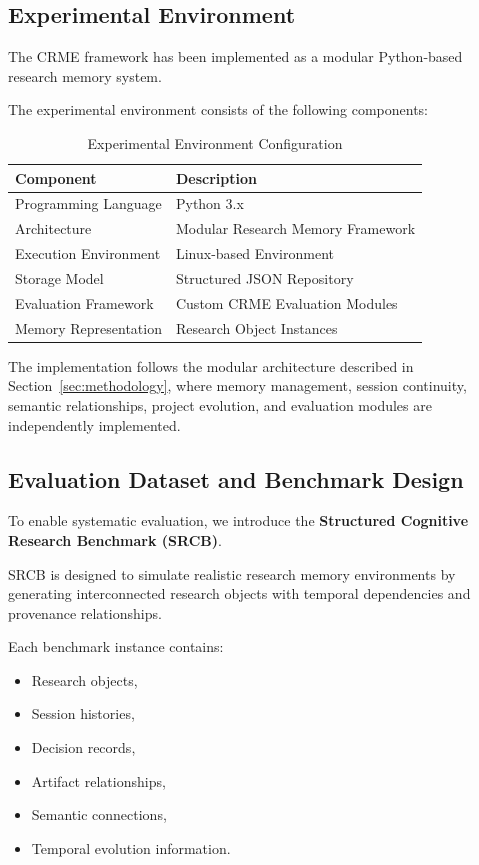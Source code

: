 \subsection{Experimental Environment}

The CRME framework has been implemented as a modular Python-based research memory system.

The experimental environment consists of the following components:

\begin{table}[h]
\centering
\caption{Experimental Environment Configuration}
\label{tab:experimental_environment}

\begin{tabular}{ll}
\hline
Component & Description\\
\hline
Programming Language & Python 3.x\\
Architecture & Modular Research Memory Framework\\
Execution Environment & Linux-based Environment\\
Storage Model & Structured JSON Repository\\
Evaluation Framework & Custom CRME Evaluation Modules\\
Memory Representation & Research Object Instances\\
\hline
\end{tabular}

\end{table}


The implementation follows the modular architecture described in Section~\ref{sec:methodology}, where memory management, session continuity, semantic relationships, project evolution, and evaluation modules are independently implemented.


\subsection{Evaluation Dataset and Benchmark Design}

To enable systematic evaluation, we introduce the
\textbf{Structured Cognitive Research Benchmark (SRCB)}.

SRCB is designed to simulate realistic research memory environments by generating interconnected research objects with temporal dependencies and provenance relationships.

Each benchmark instance contains:

\begin{itemize}
    \item Research objects,
    \item Session histories,
    \item Decision records,
    \item Artifact relationships,
    \item Semantic connections,
    \item Temporal evolution information.
\end{itemize}


